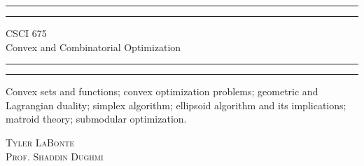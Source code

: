 \begin{titlepage} %

	\centering %
	
	\scshape %
	
	
	\rule{\textwidth}{1.6pt}\vspace*{-\baselineskip}\vspace*{2pt} %
	\rule{\textwidth}{0.4pt} %
	
	\vspace{0.75\baselineskip} %
	
	{\LARGE CSCI 675\\} %
    {\LARGE Convex and Combinatorial Optimization\\} %
	
	\vspace{0.75\baselineskip} %
	
	\rule{\textwidth}{0.4pt}\vspace*{-\baselineskip}\vspace{3.2pt} %
	\rule{\textwidth}{1.6pt} %
	
	\vspace{2\baselineskip} %
	
    
    Convex sets and functions; convex optimization problems; geometric and Lagrangian duality; simplex algorithm; ellipsoid algorithm and its implications; matroid theory; submodular optimization.
	
	\vspace*{2\baselineskip} %
	
	
	{\scshape\Large Tyler LaBonte \\ Prof. Shaddin Dughmi \\} %
	
	\vspace{0.5\baselineskip} %
	

\end{titlepage}

